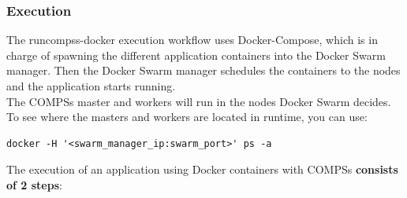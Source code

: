 \clearpage
\subsubsection{Execution}

The runcompss-docker execution workflow uses Docker-Compose, which is in charge of spawning the different application containers into the Docker Swarm manager.
Then the Docker Swarm manager schedules the containers to the nodes and the application starts running.\\

The COMPSs master and workers will run in the nodes Docker Swarm decides. To see where the masters and workers are located in runtime,
you can use:
\begin{lstlisting} 
docker -H '<swarm_manager_ip:swarm_port>' ps -a 
\end{lstlisting}

The execution of an application using Docker containers with COMPSs \textbf{consists of 2 steps}:


